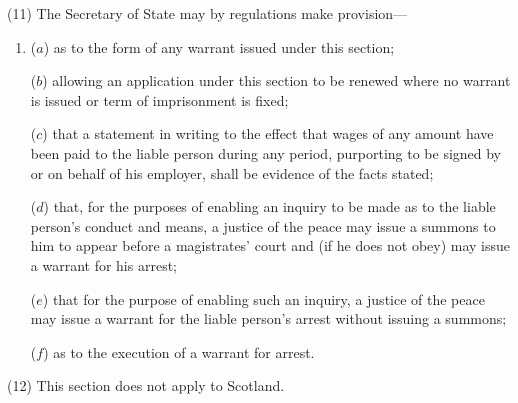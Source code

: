 \documentclass[12pt,a4paper]{article}
\begin{document}
(11)
The Secretary of State may by regulations make provision---
\begin{enumerate}\item[]
($a$) as to the form of any warrant issued under this section;

($b$) allowing an application under this section to be renewed where no warrant is issued or term of imprisonment is fixed;

($c$) that a statement in writing to the effect that wages of any amount have been paid to the liable person during any period, purporting to be signed by or on behalf of his employer, shall be evidence of the facts stated;

($d$) that, for the purposes of enabling an inquiry to be made as to the liable person’s conduct and means, a justice of the peace may issue a summons to him to appear before a magistrates’ court and (if he does not obey) may issue a warrant for his arrest;

($e$) that for the purpose of enabling such an inquiry, a justice of the peace may issue a warrant for the liable person’s arrest without issuing a summons;

($f$) as to the execution of a warrant for arrest.
\end{enumerate}

(12) This section does not apply to Scotland.


\end{document}
